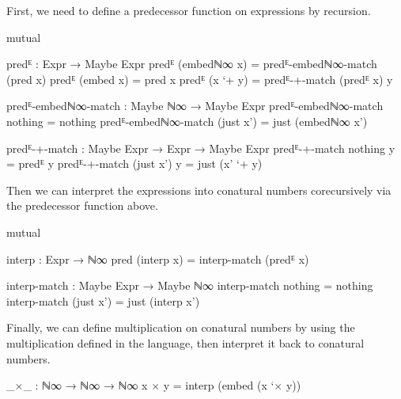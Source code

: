 First, we need to define a predecessor function on expressions by recursion.
\begin{code}[hide]
mutual
\end{code}
\begin{code}
  predᴱ : Expr → Maybe Expr
  predᴱ (embedℕ∞ x)  = predᴱ-embedℕ∞-match (pred x)
  predᴱ (embed x)    = pred x
  predᴱ (x `+ y)     = predᴱ-+-match (predᴱ x) y

  predᴱ-embedℕ∞-match : Maybe ℕ∞ → Maybe Expr
  predᴱ-embedℕ∞-match nothing    = nothing
  predᴱ-embedℕ∞-match (just x')  = just (embedℕ∞ x')

  predᴱ-+-match : Maybe Expr → Expr → Maybe Expr
  predᴱ-+-match nothing    y = predᴱ y
  predᴱ-+-match (just x')  y = just (x' `+ y)
\end{code}
Then we can interpret the expressions into conatural numbers corecursively via
the predecessor function above.
\begin{code}[hide]
mutual
\end{code}
\begin{code}
  interp : Expr → ℕ∞
  pred (interp x) = interp-match (predᴱ x)

  interp-match : Maybe Expr → Maybe ℕ∞
  interp-match nothing    = nothing
  interp-match (just x')  = just (interp x')
\end{code}
Finally, we can define multiplication on conatural numbers by using the
multiplication defined in the language, then interpret it back to conatural
numbers.
\begin{code}
_×_ : ℕ∞ → ℕ∞ → ℕ∞
x × y = interp (embed (x `× y))
\end{code}
